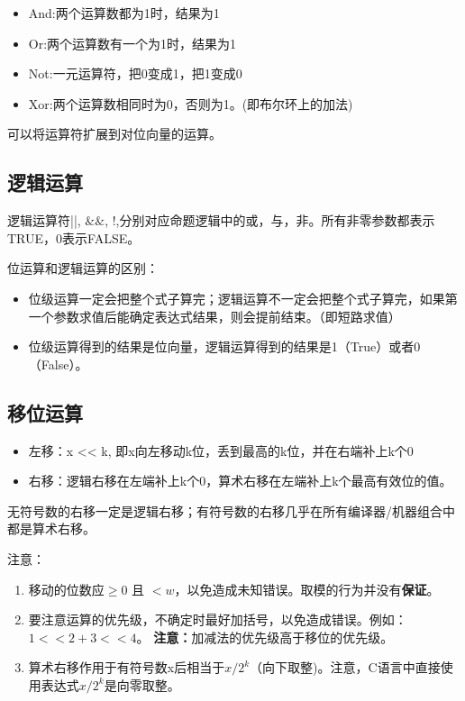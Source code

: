 \documentclass[twoside]{ctexart}
\begin{document}
    \begin{itemize}
        \item And:两个运算数都为1时，结果为1
        \item Or:两个运算数有一个为1时，结果为1
        \item Not:一元运算符，把0变成1，把1变成0
        \item Xor:两个运算数相同时为0，否则为1。(即布尔环上的加法)
    \end{itemize}
    可以将运算符扩展到对位向量的运算。
    
    \subsection{逻辑运算}
    逻辑运算符||, $\&\&$, !,分别对应命题逻辑中的或，与，非。所有非零参数都表示TRUE，0表示FALSE。
    

    位运算和逻辑运算的区别：
    \begin{itemize}
        \item 位级运算一定会把整个式子算完；逻辑运算不一定会把整个式子算完，如果第一个参数求值后能确定表达式结果，则会提前结束。（即短路求值）
        \item 位级运算得到的结果是位向量，逻辑运算得到的结果是1（True）或者0（False）。
    \end{itemize}
    \subsection{移位运算}
    \begin{itemize}
        \item 左移：x << k, 即x向左移动k位，丢到最高的k位，并在右端补上k个0
        \item 右移：逻辑右移在左端补上k个0，算术右移在左端补上k个最高有效位的值。
    \end{itemize}
    无符号数的右移一定是逻辑右移；有符号数的右移几乎在所有编译器/机器组合中都是算术右移。
    
    注意：
    \begin{enumerate}
        \item 
    移动的位数应$\ge0$ 且 $<w$，以免造成未知错误。取模的行为并没有\textbf{保证}。
    \item 要注意运算的优先级，不确定时最好加括号，以免造成错误。例如：$1<<2+3<<4$。 \textbf{注意：}加减法的优先级高于移位的优先级。
    \item 算术右移作用于有符号数x后相当于$x/2^k$（向下取整)。注意，C语言中直接使用表达式$x/2^k$是向零取整。
    \end{enumerate}
\end{document}
